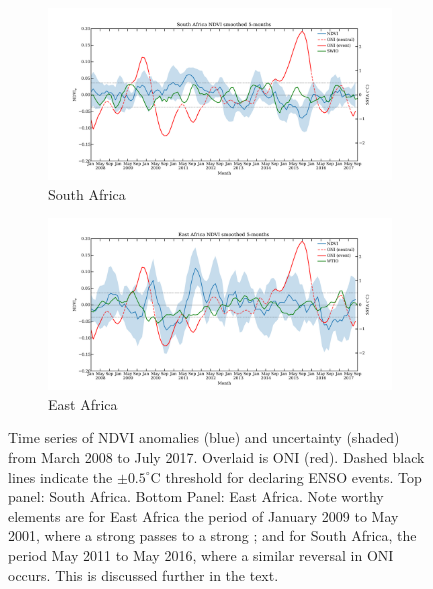 \begin{figure}
  \centering
  \begin{subfigure}{\textwidth}
    \centering
    \includegraphics[width=\textwidth]{figures/ndvi_oni_io_capetown_smoothed_5.pdf}
    \caption{South Africa}
    \label{fig:ndvi_t_south}
  \end{subfigure}
  \begin{subfigure}{\textwidth}
    \centering
    \includegraphics[width=\textwidth]{figures/ndvi_oni_io_eastafrica_smoothed_5.pdf}
    \caption{East Africa}
    \label{fig:ndvi_t_east}
    \end{subfigure}
  \caption{Time series of NDVI anomalies (blue) and uncertainty
    (shaded) from March 2008 to July 2017. Overlaid is ONI
    (red). Dashed black lines indicate the $\pm0.5^{\circ}$C threshold
    for declaring ENSO events. Top panel: South Africa. Bottom Panel:
    East Africa. Note worthy elements are for East Africa the period
    of January 2009 to May 2001, where a strong \elnino{} passes to a
    strong \nina{}; and for South Africa, the period May 2011 to May
    2016, where a similar reversal in ONI occurs. This is discussed
    further in the text.}
  \label{fig:ndvi_temporal}
\end{figure}

